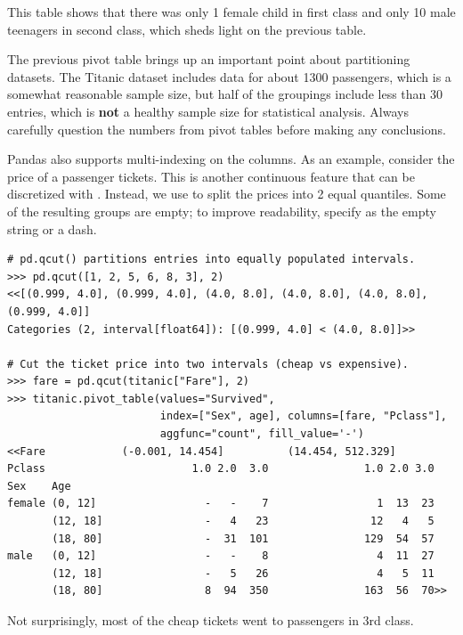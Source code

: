 This table shows that there was only 1 female child in first class and only 10 male teenagers in second class, which sheds light on the previous table.

\begin{warn}
The previous pivot table brings up an important point about partitioning datasets.
The Titanic dataset includes data for about 1300 passengers, which is a somewhat reasonable sample size, but half of the groupings include less than 30 entries, which is \textbf{not} a healthy sample size for statistical analysis.
Always carefully question the numbers from pivot tables before making any conclusions.
\end{warn}

Pandas also supports multi-indexing on the columns.
As an example, consider the price of a passenger tickets.
This is another continuous feature that can be discretized with .
Instead, we use  to split the prices into 2 equal quantiles.
Some of the resulting groups are empty; to improve readability, specify  as the empty string or a dash.

\begin{lstlisting}
# pd.qcut() partitions entries into equally populated intervals.
>>> pd.qcut([1, 2, 5, 6, 8, 3], 2)
<<[(0.999, 4.0], (0.999, 4.0], (4.0, 8.0], (4.0, 8.0], (4.0, 8.0], (0.999, 4.0]]
Categories (2, interval[float64]): [(0.999, 4.0] < (4.0, 8.0]]>>

# Cut the ticket price into two intervals (cheap vs expensive).
>>> fare = pd.qcut(titanic["Fare"], 2)
>>> titanic.pivot_table(values="Survived",
                        index=["Sex", age], columns=[fare, "Pclass"],
                        aggfunc="count", fill_value='-')
<<Fare            (-0.001, 14.454]          (14.454, 512.329]
Pclass                       1.0 2.0  3.0               1.0 2.0 3.0
Sex    Age
female (0, 12]                 -   -    7                 1  13  23
       (12, 18]                -   4   23                12   4   5
       (18, 80]                -  31  101               129  54  57
male   (0, 12]                 -   -    8                 4  11  27
       (12, 18]                -   5   26                 4   5  11
       (18, 80]                8  94  350               163  56  70>>
\end{lstlisting}

Not surprisingly, most of the cheap tickets went to passengers in 3rd class.
%


